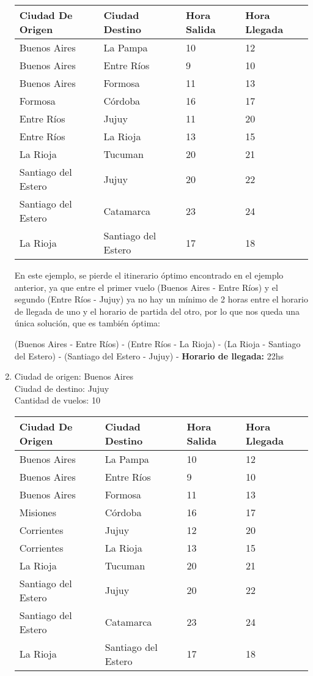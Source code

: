 \begin{enumerate}
\begin{center}
	\begin{tabular}{| l | l | l | l |}
	\hline
	Ciudad De Origen & Ciudad Destino & Hora Salida & Hora Llegada\\ \hline
	Buenos Aires & La Pampa & 10 &	12\\
	Buenos Aires & Entre Ríos & 9 & 10 \\
	Buenos Aires & Formosa	&	11	& 13\\
	Formosa	& Córdoba	& 16 & 17  \\
	Entre Ríos & Jujuy	& 11 & 20\\
	Entre Ríos & La Rioja	&	13 & 15\\
	La Rioja & Tucuman	&	20 & 21\\
	Santiago del Estero & Jujuy &	20 & 22\\
	Santiago del Estero	& Catamarca & 23 & 24\\
	La Rioja & Santiago del Estero & 17&18\\
	\hline
	\end{tabular}
\end{center}


En este ejemplo, se pierde el itinerario óptimo encontrado en el ejemplo anterior, ya que entre el primer vuelo (Buenos Aires - Entre Ríos) y el segundo (Entre Ríos - Jujuy) ya no hay un mínimo de 2 horas entre el horario de llegada de uno y el horario de partida del otro, por lo que nos queda una única solución, que es también óptima:

(Buenos Aires - Entre Ríos) - (Entre Ríos - La Rioja) - (La Rioja - Santiago del Estero) - (Santiago del Estero - Jujuy) - \textbf{Horario de llegada: } 22hs\\



\item
Ciudad de origen: Buenos Aires\\
Ciudad de destino: Jujuy\\
Cantidad de vuelos: 10\\

\begin{center}
	\begin{tabular}{| l | l | l | l |}
	\hline
	Ciudad De Origen & Ciudad Destino & Hora Salida & Hora Llegada\\ \hline
	Buenos Aires & La Pampa & 10 &	12\\
	Buenos Aires & Entre Ríos & 9 & 10 \\
	Buenos Aires & Formosa	&	11	& 13\\
	Misiones	& Córdoba	& 16 & 17  \\
	Corrientes & Jujuy	& 12 & 20\\
	Corrientes & La Rioja	&	13 & 15\\
	La Rioja & Tucuman	&	20 & 21\\
	Santiago del Estero & Jujuy &	20 & 22\\
	Santiago del Estero	& Catamarca & 23 & 24\\
	La Rioja & Santiago del Estero & 17&18\\
	\hline
	\end{tabular}
\end{center}


\end{enumerate}
